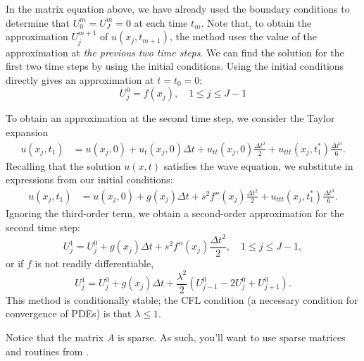 In the matrix equation above, we have already used the boundary conditions to determine that $U_{0}^{m} = U_{J}^{m} = 0$ at each time $t_m$.
Note that, to obtain the approximation $U_{j}^{m+1}$ of $u(x_j,t_{m+1})$, the method uses the value of the approximation at \emph{the previous two time steps}.
We can find the solution for the first two time steps by using the initial conditions.
Using the initial conditions directly gives an approximation at $t = t_0 = 0$:
\[U_{j}^{0} = f(x_j), \quad 1 \leq j \leq J-1\]

To obtain an approximation at the second time step, we consider the Taylor expansion
\begin{align*}
	u(x_j,t_1) &= u(x_j, 0) + u_t(x_j,0) \Delta t + u_{tt}(x_j,0) \frac{\Delta t^2}{2} + u_{ttt}(x_j,t_1^*) \frac{\Delta t^3}{6}.
\end{align*}
Recalling that the solution $u(x,t)$ satisfies the wave equation, we substitute in expressions from our initial conditions:
\begin{align*}
	u(x_j,t_1) &= u(x_j, 0) +  g(x_j) \Delta t+ s^2 f''(x_j)\frac{\Delta t^2}{2} +  u_{ttt}(x_j,t_1^*) \frac{\Delta t^3}{6}.
\end{align*}
Ignoring the third-order term, we obtain a second-order approximation for the second time step:
\begin{equation*}
U_{j}^{1}= U_{j}^{0} + g(x_j) \Delta t+ s^2 f''(x_j) \frac{\Delta t^2}{2}, \quad 1 \leq j \leq J-1,
\end{equation*}
or if $f$ is not readily differentiable,
\begin{equation}
    U_{j}^{1}= U_{j}^{0} + g(x_j) \Delta t+ \frac{\lambda^2}{2} (U^0_{j-1} -2 U^0_j + U^0_{j+1}).
    \label{waveeqn:eqn:first-time-step}
\end{equation}
This method is conditionally stable; the CFL condition (a necessary condition for convergence of PDEs) is that $\lambda \leq 1$.

Notice that the matrix $A$ is sparse.
As such, you'll want to use sparse matrices and routines from .

